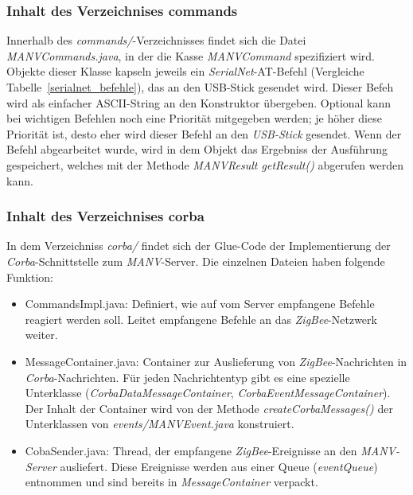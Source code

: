     \subsubsection{Inhalt des Verzeichnises commands}

    Innerhalb des \emph{commands/}-Verzeichnisses findet sich die Datei \emph{MANVCommands.java},
    in der die Kasse \emph{MANVCommand} spezifiziert wird. Objekte dieser Klasse kapseln jeweils
    ein \emph{SerialNet}-AT-Befehl (Vergleiche Tabelle~\ref{serialnet_befehle}), das an den
    USB-Stick gesendet wird. Dieser Befeh wird als einfacher ASCII-String an den Konstruktor
    übergeben. Optional kann bei wichtigen Befehlen noch eine Priorität mitgegeben werden;
    je höher diese Priorität ist, desto eher wird dieser Befehl an den \emph{USB-Stick}
    gesendet. Wenn der Befehl abgearbeitet wurde, wird in dem Objekt das Ergebniss
    der Ausführung gespeichert, welches mit der Methode \emph{MANVResult getResult()}
    abgerufen werden kann.

    \subsubsection{Inhalt des Verzeichnises corba}

    In dem Verzeichniss \emph{corba/} findet sich der Glue-Code der Implementierung der \emph{Corba}-Schnittstelle
    zum \emph{MANV}-Server. Die einzelnen Dateien haben folgende Funktion:

    \begin{itemize}
        \item{CommandsImpl.java:} Definiert, wie auf vom Server empfangene Befehle reagiert werden soll.
                                  Leitet empfangene Befehle an das \emph{ZigBee}-Netzwerk weiter.
        \item{MessageContainer.java:} Container zur Auslieferung von \emph{ZigBee}-Nachrichten in \emph{Corba}-Nachrichten.
                                      Für jeden Nachrichtentyp gibt es eine spezielle Unterklasse 
                                      (\emph{CorbaDataMessageContainer},
                                      \emph{CorbaEventMessageContainer}). Der Inhalt der Container wird von der Methode 
                                      \emph{createCorbaMessages()} der Unterklassen von \emph{events/MANVEvent.java}
                                      konstruiert.
        \item{CobaSender.java:} Thread, der empfangene \emph{ZigBee}-Ereignisse an den \emph{MANV-Server} ausliefert.
                                Diese Ereignisse werden aus einer Queue (\emph{eventQueue}) entnommen und sind
                                bereits in \emph{MessageContainer} verpackt.
    \end{itemize}

